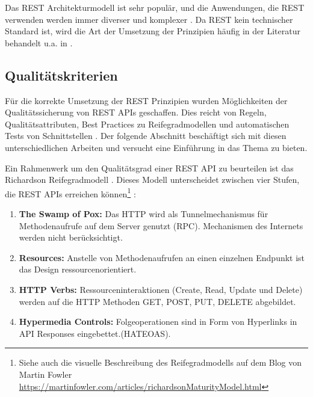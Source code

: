 Das \acs{REST} Architekturmodell ist sehr populär, und die Anwendungen, die \acs{REST} verwenden werden immer diverser und komplexer \parencite{kotstein_which_2021}. Da \acs{REST} kein technischer Standard ist, wird die Art der Umsetzung der Prinzipien häufig in der Literatur behandelt u.a. in \parencite{richardson_restful_2007}\parencite{masse_rest_2011}\parencite{webber_rest_2010}\parencite{renzel_todays_2012}.

\subsection{Qualitätskriterien} \label{sec:qualitätskriterien}
Für die korrekte Umsetzung der \acs{REST} Prinzipien wurden Möglichkeiten der Qualitätssicherung von \acs{REST} \acs{API}s geschaffen. Dies reicht von Regeln, Qualitätsattributen, Best Practices zu Reifegradmodellen und automatischen Tests von Schnittstellen \parencite{kotstein_which_2021}. Der folgende Abschnitt beschäftigt sich mit diesen unterschiedlichen Arbeiten und versucht eine Einführung in das Thema zu bieten.

Ein Rahmenwerk um den Qualitätsgrad einer \acs{REST} \acs{API} zu beurteilen ist das Richardson Reifegradmodell \parencite{richardson_restful_2007}. Dieses Modell unterscheidet zwischen vier Stufen, die \acs{REST} \acs{API}s erreichen können\footnote{Siehe auch die visuelle Beschreibung des Reifegradmodells auf dem Blog von Martin Fowler \href{https://martinfowler.com/articles/richardsonMaturityModel.html}{https://martinfowler.com/articles/richardsonMaturityModel.html}} \parencite{pautasso_restful_2014}:
\begin{enumerate}
  \item \textbf{The Swamp of Pox:} Das \acf{HTTP} wird als Tunnelmechanismus für Methodenaufrufe auf dem Server genutzt (\acf{RPC}). Mechanismen des Internets werden nicht berücksichtigt.
  \item \textbf{Resources:} Anstelle von Methodenaufrufen an einen einzelnen Endpunkt ist das Design ressourcenorientiert.
  \item \textbf{HTTP Verbs:} Ressourceninteraktionen (Create, Read, Update und Delete) werden auf die \acs{HTTP} Methoden GET, POST, PUT, DELETE abgebildet.
  \item \textbf{Hypermedia Controls:} Folgeoperationen sind in Form von Hyperlinks in \acs{API} Responses eingebettet.(\acs{HATEOAS}).
\end{enumerate}

